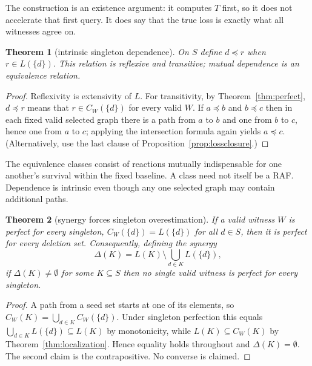 \documentclass[11pt,a4paper]{article}
\theoremstyle{plain}
\newtheorem{theorem}{Theorem}[section]
\theoremstyle{definition}
\theoremstyle{remark}
\begin{document}
The construction is an existence argument: it computes $T$ first, so it does not accelerate that first query. It does say that the true loss is exactly what all witnesses agree on.

\begin{theorem}[intrinsic singleton dependence]\label{thm:preorder}
On $S$ define $d\preccurlyeq r$ when $r\in L(\{d\})$. This relation is reflexive and transitive; mutual dependence is an equivalence relation.
\end{theorem}

\begin{proof}
Reflexivity is extensivity of $L$. For transitivity, by Theorem~\ref{thm:perfect}, $d\preccurlyeq r$ means that $r\in C_W(\{d\})$ for every valid $W$. If $a\preccurlyeq b$ and $b\preccurlyeq c$ then in each fixed valid selected graph there is a path from $a$ to $b$ and one from $b$ to $c$, hence one from $a$ to $c$; applying the intersection formula again yields $a\preccurlyeq c$. (Alternatively, use the last clause of Proposition~\ref{prop:lossclosure}.)
\end{proof}

The equivalence classes consist of reactions mutually indispensable for one another's survival within the fixed baseline. A class need not itself be a RAF. Dependence is intrinsic even though any one selected graph may contain additional paths.

\begin{theorem}[synergy forces singleton overestimation]\label{thm:synergy}
If a valid witness $W$ is perfect for every singleton, $C_W(\{d\})=L(\{d\})$ for all $d\in S$, then it is perfect for every deletion set. Consequently, defining the \emph{synergy}
\[
\Delta(K)=L(K)\setminus\bigcup_{d\in K}L(\{d\}),
\]
if $\Delta(K)\neq\emptyset$ for some $K\subseteq S$ then no single valid witness is perfect for every singleton.
\end{theorem}

\begin{proof}
A path from a seed set starts at one of its elements, so $C_W(K)=\bigcup_{d\in K}C_W(\{d\})$. Under singleton perfection this equals $\bigcup_{d\in K}L(\{d\})\subseteq L(K)$ by monotonicity, while $L(K)\subseteq C_W(K)$ by Theorem~\ref{thm:localization}. Hence equality holds throughout and $\Delta(K)=\emptyset$. The second claim is the contrapositive. No converse is claimed.
\end{proof}
\end{document}
